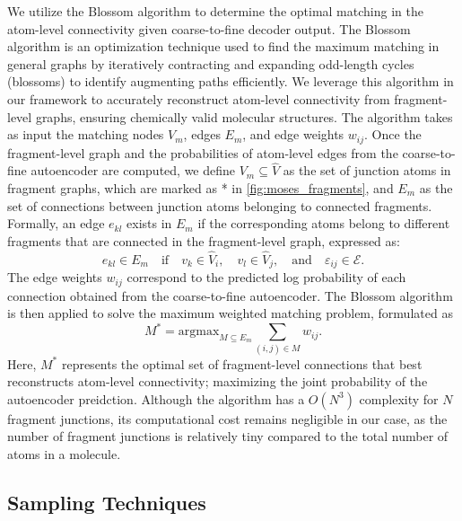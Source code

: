 We utilize the Blossom algorithm \citep{blossom_alg} to determine the optimal matching in the atom-level connectivity given coarse-to-fine decoder output.
The Blossom algorithm is an optimization technique used to find the maximum matching in general graphs by iteratively contracting and expanding odd-length cycles (blossoms) to identify augmenting paths efficiently. 
We leverage this algorithm in our framework to accurately reconstruct atom-level connectivity from fragment-level graphs, ensuring chemically valid molecular structures.
The algorithm takes as input the matching nodes $V_m$, edges $E_m$, and edge weights $w_{ij}$. 
Once the fragment-level graph and the probabilities of atom-level edges from the coarse-to-fine autoencoder are computed, we define $V_m \subseteq \hat{V}$ as the set of junction atoms in fragment graphs, which are marked as * in \cref{fig:moses_fragments}, and $E_m$ as the set of connections between junction atoms belonging to connected fragments. 
Formally, an edge $e_{kl}$ exists in $E_m$ if the corresponding atoms belong to different fragments that are connected in the fragment-level graph, expressed as: 
\begin{equation}
    e_{kl} \in E_m \quad \text{if} \quad v_k \in \hat{V}_i, \quad v_l \in \hat{V}_j, 
    \quad \text{and} \quad \varepsilon_{ij} \in \mathcal{E}.
\end{equation}
The edge weights  $w_{ij}$  correspond to the predicted log probability of each connection obtained from the coarse-to-fine autoencoder. 
The Blossom algorithm is then applied to solve the maximum weighted matching problem, formulated as
\begin{equation}
    M^* = \text{argmax}_{M \subseteq E_m} \sum_{(i,j) \in M} w_{ij}.
\end{equation}
Here, $M^{*}$ represents the optimal set of fragment-level connections that best reconstructs atom-level connectivity; maximizing the joint probability of the autoencoder preidction. Although the algorithm has a $O(N^3)$ complexity for $N$ fragment junctions,  its computational cost remains negligible in our case, as the number of fragment junctions is relatively tiny compared to the total number of atoms in a molecule.


\subsection{Sampling Techniques}
\label{appsubsec:sampling_techniques}


